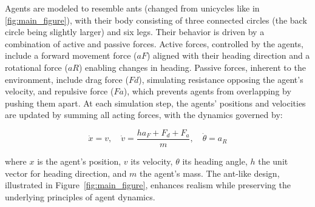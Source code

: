 \documentclass[9pt]{IEEEtran}
\begin{document}
Agents are modeled to resemble ants (changed from unicycles like in \ref{fig:main_figure}), with their body consisting of three connected circles (the back circle being slightly larger) and six legs. Their behavior is driven by a combination of active and passive forces. Active forces, controlled by the agents, include a forward movement force ($aF$) aligned with their heading direction and a rotational force ($aR$) enabling changes in heading. Passive forces, inherent to the environment, include drag force ($Fd$), simulating resistance opposing the agent's velocity, and repulsive force ($Fa$), which prevents agents from overlapping by pushing them apart. At each simulation step, the agents' positions and velocities are updated by summing all acting forces, with the dynamics governed by:

$$ \dot{x} = v, \quad \dot{v} = \frac{ha_F + F_d + F_a}{m}, \quad \dot{\theta} = a_R $$  

where $x$ is the agent's position, $v$ its velocity, $\theta$ its heading angle, $h$ the unit vector for heading direction, and $m$ the agent's mass. The ant-like design, illustrated in Figure~\ref{fig:main_figure}, enhances realism while preserving the underlying principles of agent dynamics.
\end{document}
